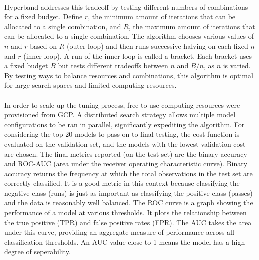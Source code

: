 \documentclass[11pt]{article}
\begin{document}
\begin{multicols*}{2}
            \vspace{-10pt}

            \paragraph{}
                Hyperband addresses this tradeoff by testing different numbers of combinations for a fixed budget. 
                Define $r$, the minimum amount of iterations that can be allocated to a single combination, and $R$, the maximum amount of iterations that can be allocated to a single combination. 
                The algorithm chooses various values of $n$ and $r$ based on $R$ (outer loop) and then runs successive halving on each fixed $n$ and $r$ (inner loop). 
                A run of the inner loop is called a bracket. 
                Each bracket uses a fixed budget $B$ but tests different tradeoffs between $n$ and $B/n$, as $n$ is varied.
                By testing ways to balance resources and combinations, this algorithm is optimal for large search spaces and limited computing resources. 
            
            \vspace{-15pt}
            
            \paragraph{}
                In order to scale up the tuning process, free to use computing resources were provisioned from GCP.
                A distributed search strategy allows multiple model configurations to be ran in parallel, significantly expediting the algorithm.  
                For considering the top 20 models to pass on to final testing, the cost function is evaluated on the validation set, and the models with the lowest validation cost are chosen. 
                The final metrics reported (on the test set) are the binary accuracy and ROC-AUC (area under the receiver operating characteristic curve). 
                Binary accuracy returns the frequency at which the total observations in the test set are correctly classified. 
                It is a good metric in this context because classifying the negative class (runs) is just as important as classifying the positive class (passes) and the data is reasonably well balanced.
                The ROC curve is a graph showing the performance of a model at various thresholds. 
                It plots the relationship between the true positive (TPR) and false positive rates (FPR).
                The AUC takes the area under this curve, providing an aggregate measure of performance across all classification thresholds.
                An AUC value close to 1 means the model has a high degree of seperability. 
                
    \end{multicols*}
\end{document}
